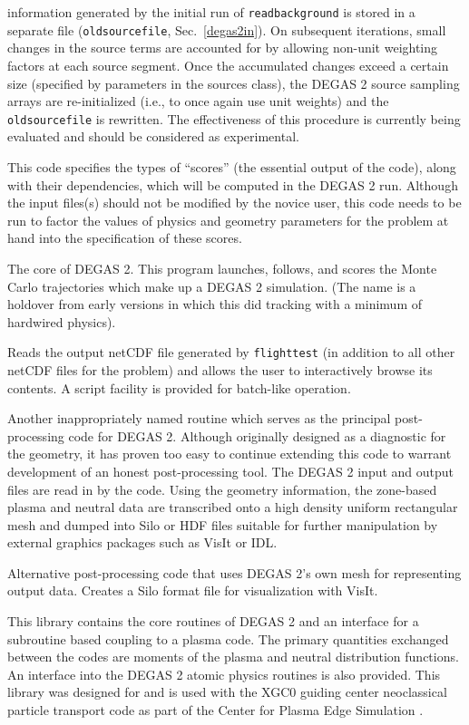 \documentclass[12pt]{report}
\begin{document}
\begin{description}
information generated by the initial run of {\tt readbackground} is 
stored in a separate file ({\tt oldsourcefile},
Sec.~\ref{degas2in}). On subsequent
iterations, small changes in the source terms are accounted for
by allowing non-unit weighting factors at each source segment.
Once the accumulated changes exceed a certain size (specified by
parameters in the sources class), the DEGAS 2 source sampling
arrays are re-initialized (i.e., to once again use unit weights)
and the {\tt oldsourcefile} is rewritten. The effectiveness of this
procedure is currently being evaluated and should be considered
as experimental.
\item[tallysetup] This code specifies the types of ``scores'' (the
essential output of the code), along with their
dependencies, which will be computed in the DEGAS 2 run. Although the input
files(s) should not be modified by the novice user, this code needs to be
run to factor the values of physics and geometry parameters for the
problem at hand into the specification of these scores.
\item[flighttest] The core of DEGAS 2. This program launches, follows,
and scores the Monte Carlo trajectories which make up a DEGAS 2 simulation.
(The name is a holdover from early versions in which this did tracking 
with a minimum of hardwired physics).
\item[outputbrowser] Reads the output netCDF file generated by
{\tt flighttest} (in addition to all other netCDF files for the
problem) and allows the user to interactively browse its contents.
A script facility is provided for batch-like operation. 
\item[geomtesta] Another inappropriately named routine which serves as
the principal post-processing code for DEGAS 2. Although originally
designed as a diagnostic for the geometry, it has proven too easy to 
continue extending this code to warrant development of an honest
post-processing tool. The DEGAS 2 input and output files are read in by
the code. Using the geometry information, the zone-based plasma and neutral
data are transcribed onto a high density uniform rectangular mesh and
dumped into Silo or HDF files suitable for further manipulation by 
external graphics packages such as VisIt or IDL.
\item[ucd\_plot] Alternative post-processing code that uses DEGAS 2's
own mesh for representing output data.  Creates a Silo format file
for visualization with VisIt.
\item[degas2\_xgc.a] This library contains the core routines of DEGAS 2
and an interface for a subroutine based coupling to a plasma code.
The primary quantities exchanged between the codes are moments of the
plasma and neutral distribution functions.  An interface into the
DEGAS 2 atomic physics routines is also provided.  This library was
designed for and is used with the XGC0 guiding center neoclassical
particle transport code as part of the Center for Plasma Edge
Simulation \cite{Chan2008}.
\end{description}
\end{document}
